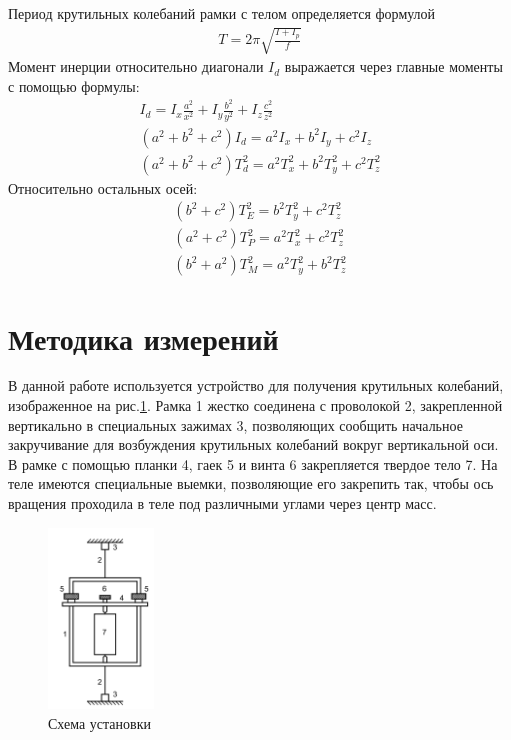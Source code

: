 Период крутильных колебаний рамки с телом определяется формулой \begin{gather}
   T = 2\pi\sqrt{\frac{I + I_p}{ f}}
\end{gather}
Момент инерции относительно диагонали $ I_d $ выражается через главные моменты с помощью формулы: \begin{gather}
   I_d = I_x \frac{a^2}{x^2} + I_y\frac{b^2}{y^2} + I_z\frac{c^2}{z^2} \\
   (a^2 + b^2 + c^2)I_d = a^2I_x + b^2 I_y + c^2 I_z \\
   (a^2 + b^2 + c^2)T_d^2 = a^2T^2_x + b^2 T^2_y + c^2 T^2_z \label{firstcheck}
\end{gather}
Относительно остальных осей: \begin{gather}
   (b^2 + c^2)T^2_E = b^2 T_y^2 + c^2 T_z^2 \label{2check} \\
   (a^2 + c^2)T^2_P = a^2 T_x^2 + c^2 T_z^2 \label{3check}\\
   (b^2 + a^2)T^2_M = a^2 T_y^2 + b^2 T_z^2 \label{4check}
\end{gather}
\section{Методика измерений}
В данной работе используется устройство для получения крутильных колебаний, изображенное на рис.\ref{fig:scheme}. Рамка 1 жестко соединена
с проволокой 2, закрепленной вертикально в специальных зажимах
3, позволяющих сообщить начальное закручивание для возбуждения
крутильных колебаний вокруг вертикальной оси. В рамке с помощью
планки 4, гаек 5 и винта 6 закрепляется твердое тело 7. На теле имеются специальные выемки, позволяющие его закрепить так, чтобы ось
вращения проходила в теле под различными углами через центр масс.
 \begin{figure}[h]
   \centering
   \includegraphics[width = 0.25\textwidth]{images/1.png}
   \caption{Схема установки}
   \label{fig:scheme}
\end{figure}

